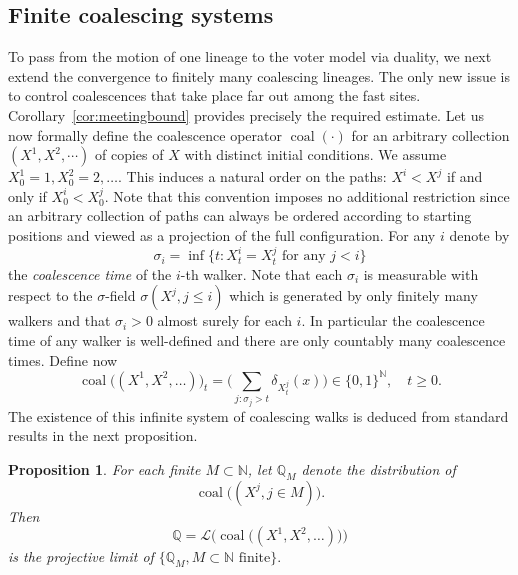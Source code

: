 \documentclass[11pt,a4paper]{scrartcl}
\numberwithin{equation}{section}
\theoremstyle{plain}
\newtheorem{proposition}[theorem]{Proposition}
\theoremstyle{definition}
\theoremstyle{remark}
\newcommand{\bN}{\ensuremath{\mathbb{N}}}
\begin{document}
\subsection*{Finite coalescing systems}
To pass from the motion of one lineage to the voter model via duality, we next extend the convergence to finitely many coalescing lineages. The only new issue is to control coalescences that take place far out among the fast sites. Corollary~\ref{cor:meetingbound} provides precisely the required estimate.
Let us now formally define the coalescence operator $\operatorname{coal}(\cdot)$ for an arbitrary collection $(X^{1},X^{2},\cdots)$ of copies of $X$ with distinct initial conditions. We assume $X^{1}_0=1, X^{2}_0=2,\dots$. This induces a natural order on the paths: $X^{i}<X^{j}$ if and only if $X^{i}_0<X^{j}_0$. Note that this convention imposes no additional restriction since an arbitrary collection of paths can always be ordered according to starting positions and viewed as a projection of the full configuration. For any $i$ denote by $$\sigma_{i}=\inf\{t: X_t^{i}=X_t^{j} \text{ for any }j<i\}$$ the \emph{coalescence time} of the $i$-th walker. Note that each $\sigma_i$ is measurable with respect to the $\sigma$-field $\sigma(X^{j}, j\leq i)$ which is generated by only finitely many walkers and that $\sigma_i>0$ almost surely for each $i$. In particular the coalescence time of any walker is well-defined and there are only countably many coalescence times. Define now
\begin{equation}\label{eq:coaldefi}
\operatorname{coal}\big((X^{1},X^{2},\dots)\big)_t=\Big(\sum_{j: \sigma_j> t}\delta_{X^{j}_t}(x)\Big)\in \{0,1\}^{\bN}, \quad t\geq 0.
\end{equation}
The existence of this infinite system of coalescing walks is deduced from standard results in the next proposition.
\begin{proposition}\label{prop:projlim}
For each finite $M\subset\bN$, let $\mathbb{Q}_M$ denote the distribution of
\[
\operatorname{coal}\big((X^{j}, j\in M)\big).
\]
Then
$$
\mathbb{Q}=\mathcal{L}\big(\operatorname{coal}\big((X^{1},X^{2},\dots)\big)\big)
$$
is the projective limit of $\{\mathbb{Q}_M, M\subset\bN \text{ finite}\}.$
\end{proposition}
\end{document}
